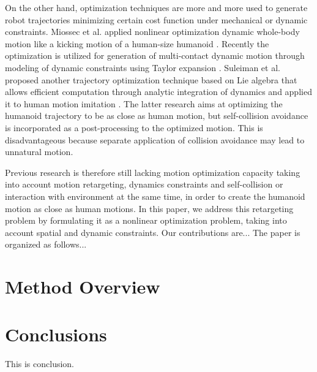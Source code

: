 \documentclass[letterpaper, 10 pt, conference]{ieeeconf}  %
\begin{document}
On the other hand, optimization techniques are more and more used to
generate robot trajectories minimizing certain cost function under
mechanical or dynamic constraints.
Miossec et al. applied nonlinear optimization dynamic whole-body motion
like a kicking motion of a human-size humanoid \cite{Miossec06ROBIO}.
Recently the optimization is utilized for generation of multi-contact
dynamic motion through modeling of dynamic constraints using Taylor
expansion \cite{Lengagne13IJRR}.
Suleiman et al. proposed another trajectory optimization technique
based on Lie 
algebra that allows efficient computation through analytic integration
of dynamics \cite{Suleiman07Humanoids} and applied it to human motion
imitation \cite{Suleiman08ICRA}. 
The latter research aims at optimizing the humanoid trajectory to be as
close as human motion, but self-collision avoidance is incorporated as
a post-processing to the optimized motion. This is disadvantageous
because separate application of collision avoidance may lead to
unnatural motion. 


Previous research is therefore still lacking 
motion optimization capacity taking into account
motion retargeting, dynamics constraints and
self-collision or interaction with environment at the same time, in
order to create the humanoid motion as close as human motions.
In this paper, we address this retargeting problem by formulating it
as a nonlinear optimization problem, taking into account spatial and
dynamic constraints.
Our contributions are...
The paper is organized as follows...

\section{Method Overview}
\label{sec:overview}


\section{Conclusions}

This is conclusion.

\end{document}
